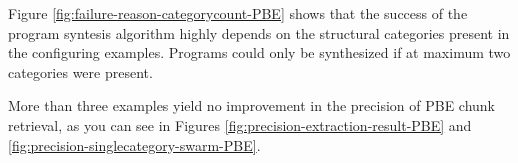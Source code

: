 \documentclass[\myrootdir/main.tex]{subfiles}
\begin{document}
Figure \ref{fig:failure-reason-categorycount-PBE} shows that the success of the program syntesis algorithm highly depends on the structural categories present in the configuring examples.
Programs could only be synthesized if at maximum two categories were present.

More than three examples yield no improvement in the precision of PBE chunk retrieval, as you can see in Figures \ref{fig:precision-extraction-result-PBE} and \ref{fig:precision-singlecategory-swarm-PBE}.

\end{document}
